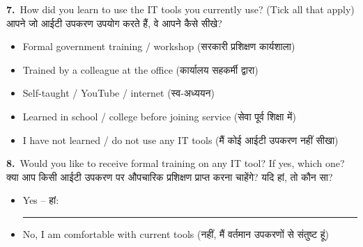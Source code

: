 \documentclass[11pt,a4paper]{article}
\newcommand{\hindi}[1]{{\hindifont #1}}
\newcommand{\q}[2]{%
  \vspace{4pt}
  \noindent\textbf{#1.}~#2\\[2pt]
}
\newcommand{\choices}[1]{%
  \begin{itemize}[label=$\square$, leftmargin=1.4em, itemsep=1pt, topsep=2pt]
    #1
  \end{itemize}
}
\begin{document}
\begin{tcolorbox}[colback=streama,colframe=govblue,arc=2mm,boxrule=0.6pt,
  title={\textbf{STREAM A -- For Department Officials \& Employees} \quad \small\hindi{(विभागीय अधिकारी एवं कर्मचारी)}},fonttitle=\normalsize]
\q{7}{How did you learn to use the IT tools you currently use? (Tick all that apply)\\
\hindi{आपने जो आईटी उपकरण उपयोग करते हैं, वे आपने कैसे सीखे?}}
\choices{
  \item Formal government training / workshop \hindi{(सरकारी प्रशिक्षण कार्यशाला)}
  \item Trained by a colleague at the office \hindi{(कार्यालय सहकर्मी द्वारा)}
  \item Self-taught / YouTube / internet \hindi{(स्व-अध्ययन)}
  \item Learned in school / college before joining service \hindi{(सेवा पूर्व शिक्षा में)}
  \item I have not learned / do not use any IT tools \hindi{(मैं कोई आईटी उपकरण नहीं सीखा)}
}

\q{8}{Would you like to receive formal training on any IT tool? If yes, which one?\\
\hindi{क्या आप किसी आईटी उपकरण पर औपचारिक प्रशिक्षण प्राप्त करना चाहेंगे? यदि हां, तो कौन सा?}}
\choices{
  \item Yes -- \hindi{हां:} \rule{8cm}{0.3pt}
  \item No, I am comfortable with current tools \hindi{(नहीं, मैं वर्तमान उपकरणों से संतुष्ट हूं)}
}

\end{tcolorbox}

\vspace{0.5cm}
\end{document}
